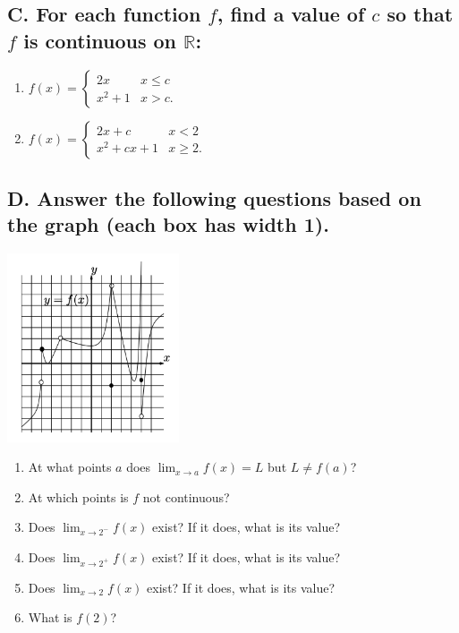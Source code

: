 \documentclass{article}
\begin{document}
\subsection*{C. For each function $f$, find a value of $c$ so that $f$ is continuous on $\mathbb{R}$:}
\begin{multicols}{2}
\begin{enumerate}
\item $f(x)=\begin{cases}2x & x \leq c \\ x^2+1 & x > c.\end{cases}$
\item $f(x)=\begin{cases}2x+c & x < 2 \\ x^2 + cx +1 & x \geq 2.\end{cases}$
\end{enumerate}
\end{multicols}

\subsection*{D. Answer the following questions based on the graph (each box has width 1).}
\begin{paracol}{2}
\includegraphics[width=2in]{img/piecewise.png}
\switchcolumn
\vspace{2em}

\begin{enumerate}
\item At what points $a$ does $\displaystyle \lim_{x\to a} f(x)=L$ but $L\neq f(a)$?
\item At which points is $f$ not continuous?
\item Does $\displaystyle\lim _{x \to 2^{-}} f(x)$ exist? If it does, what is its value?
\item Does $\displaystyle\lim _{x \to 2^{+}} f(x)$ exist? If it does, what is its value?
\item Does $\displaystyle\lim _{x \to 2} f(x)$ exist? If it does, what is its value?
\item What is $f(2)$?
\end{enumerate}
\end{paracol}
\end{document}
